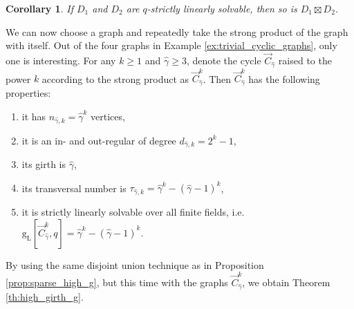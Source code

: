 \documentclass[a4paper, 11pt]{book}
\numberwithin{equation}{section}
\theoremstyle{plain}
\newtheorem{corollary}	[equation]	{Corollary}
\newcommand{\feedback}{\tau}
\newcommand{\linear}[1]{#1_\mathrm{L}}
\newcommand{\guessing}{\mathrm{g}}
\newcommand{\linearGuessing}{\linear{\guessing}}
\renewcommand{\(}{\ldbrack}
\renewcommand{\)}{\rdbrack}
\begin{document}
\begin{corollary}
If $D_1$ and $D_2$ are $q$-strictly linearly solvable, then so is $D_1 \boxtimes D_2$.
\end{corollary}


We can now choose a graph and repeatedly take the strong product of the graph with itself. Out of the four graphs in Example \ref{ex:trivial_cyclic_graphs}, only one is interesting. For any $k \ge 1$ and $\hat{\gamma} \ge 3$, denote the cycle $\vec{C}_{\hat{\gamma}}$ raised to the power $k$ according to the strong product as $\vec{C}_{\hat{\gamma}}^k$. Then $\vec{C}_{\hat{\gamma}}^k$ has the following properties:
\begin{enumerate}
	\item it has $n_{\hat{\gamma},k} = \hat{\gamma}^k$ vertices,
	
	\item it is an in- and out-regular of degree $d_{\hat{\gamma},k} = 2^k - 1$,
	
	\item its girth is $\hat{\gamma}$,
	
	
	\item its transversal number is $\feedback_{\hat{\gamma}, k} = \hat{\gamma}^k - (\hat{\gamma} - 1)^k$,
	
	\item it is strictly linearly solvable over all finite fields, i.e. $\linearGuessing[\vec{C}_{\hat{\gamma}}^k, q] = \hat{\gamma}^k - (\hat{\gamma} - 1)^k$.
\end{enumerate}
By using the same disjoint union technique as in Proposition \ref{prop:sparse_high_g}, but this time with the graphs $\vec{C}_{\hat{\gamma}}^k$, we obtain Theorem \ref{th:high_girth_g}.
\end{document}
